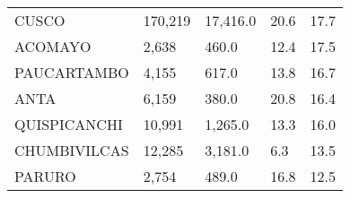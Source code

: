 \begin{tabular}{lllll}
	\cellcolor[HTML]{FF5050}CUSCO                                  & 170,219                                                               & 17,416.0                                                                         & 20.6                                                                        & 17.7                                                                                \\
	\cellcolor[HTML]{FF5050}ACOMAYO                                & 2,638                                                                 & 460.0                                                                            & 12.4                                                                        & 17.5                                                                                \\
	\cellcolor[HTML]{FF5050}PAUCARTAMBO                            & 4,155                                                                 & 617.0                                                                            & 13.8                                                                        & 16.7                                                                                \\
	\cellcolor[HTML]{FF5050}ANTA                                   & 6,159                                                                 & 380.0                                                                            & 20.8                                                                        & 16.4                                                                                \\
	\cellcolor[HTML]{FF5050}QUISPICANCHI                           & 10,991                                                                & 1,265.0                                                                          & 13.3                                                                        & 16.0                                                                                \\
	\cellcolor[HTML]{FF5050}CHUMBIVILCAS                           & 12,285                                                                & 3,181.0                                                                          & 6.3                                                                         & 13.5                                                                                \\
	\cellcolor[HTML]{FF5050}PARURO                                 & 2,754                                                                 & 489.0                                                                            & 16.8                                                                        & 12.5                                                                                \\

\end{tabular}
